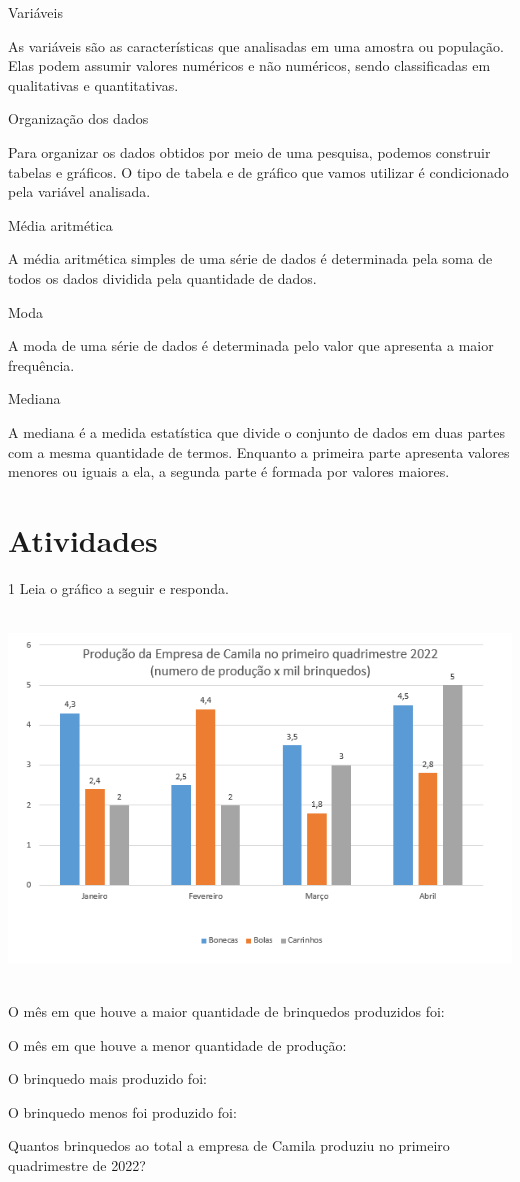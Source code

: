 {Variáveis

As variáveis são as características que analisadas em uma amostra ou
população. Elas podem assumir valores numéricos e não numéricos, sendo
classificadas em qualitativas e quantitativas.

Organização dos dados

Para organizar os dados obtidos por meio de uma pesquisa, podemos
construir tabelas e gráficos. O tipo de tabela e de gráfico que vamos
utilizar é condicionado pela variável analisada.

Média aritmética

A média aritmética simples de uma série de dados é determinada pela soma
de todos os dados dividida pela quantidade de dados.

Moda

A moda de uma série de dados é determinada pelo valor que apresenta a
maior frequência.

Mediana

A mediana é a medida estatística que divide o conjunto de dados em duas
partes com a mesma quantidade de termos. Enquanto a primeira parte
apresenta valores menores ou iguais a ela, a segunda parte é formada por
valores maiores.

\section{Atividades}

\num{1} Leia o gráfico a seguir e responda.

\includegraphics[width=5.90625in,height=3.86458in]{./imgSAEB_8_MAT/media/image39.png}
\item O mês em que houve a maior quantidade de brinquedos produzidos foi:
\item O mês em que houve a menor quantidade de produção:
\item O brinquedo mais produzido foi:
\item O brinquedo menos foi produzido foi:
\item Quantos brinquedos ao total a empresa de Camila produziu no primeiro
quadrimestre de 2022?

}
